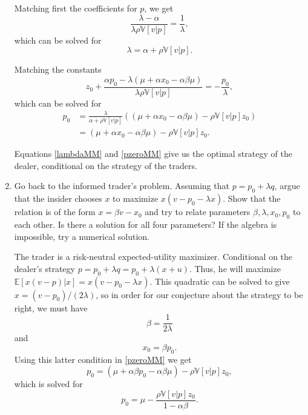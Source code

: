\documentclass[11pt
, answers
]{exam}
\begin{document}
\begin{enumerate}[label=(\alph*). ]
\begin{solution}
 Matching first the coefficients for $p$, we get
\[
 \frac{\lambda-\alpha}{\lambda \rho \mathbb{V}[v|p]} =\frac{1}{\lambda},
\]
which can be solved for
\begin{equation} \label{lambdaMM}
\lambda =  \alpha + \rho \mathbb{V}[v|p].
\end{equation}

Matching the constants
\[
z_{0}+\frac{\alpha p_{0}-\lambda(\mu + \alpha x_{0} - \alpha \beta \mu) }{\lambda \rho \mathbb{V}[v|p]} = -\frac{p_{0}}{\lambda},
\]
which can be solved for 
\begin{align}
	p_{0} &=  \frac{\lambda}{\alpha+\rho \mathbb{V}[v|p]}((\mu + \alpha x_{0} - \alpha \beta \mu) - \rho \mathbb{V}[v|p] z_{0}) 
	\nonumber
	\\
	&=(\mu + \alpha x_{0} - \alpha \beta \mu) - \rho \mathbb{V}[v|p] z_{0}.
	\label{pzeroMM}
\end{align}

Equations \eqref{lambdaMM} and \eqref{pzeroMM} give us the optimal strategy of the dealer, conditional on the strategy of the traders.
\end{solution}

\item Go back to the informed trader's problem. Assuming that $p=p_{0}+ \lambda q$, argue that the insider chooses $x$ to maximize $x (v-p_{0} - \lambda x)$. Show that the relation is of the form $x =\beta v - x_{0}$ and try to relate parameters $\beta, \lambda, x_{0}, p_{0}$ to each other. Is there a solution for all four parameters? If the algebra is impossible, try a numerical solution.

\begin{solution}
The trader is a risk-neutral expected-utility maximizer. Conditional on the dealer's strategy $p=p_{0}+\lambda q=p_{0}+\lambda(x+u)$. Thus, he will maximize $\mathbb{E}[x(v-p)|x] = x(v-p_{0}-\lambda x)$. This quadratic can be solved to give $x=(v-p_{0})/(2\lambda)$, so in order for our conjecture about the strategy to be right, we must have
\begin{equation} \label{lambdatrader}
\beta=\frac{1}{2\lambda}
\end{equation}
and 
\begin{equation}
	x_{0}=\beta p_{0}.
	\label{eq:x0}
\end{equation} 
Using this latter condition in \eqref{pzeroMM} we get
\begin{equation}
	p_{0} = (\mu + \alpha \beta p_0 - \alpha \beta \mu) - \rho \mathbb{V}[v|p] z_{0},
\end{equation}
which is solved for
\begin{equation}
	p_{0} = \mu- \frac{\rho \mathbb{V}[v|p] z_0}{1-\alpha\beta}.
	\label{eq:p0}
\end{equation}
 

\end{solution}
\end{enumerate}
\end{document}
